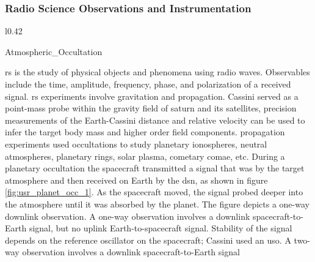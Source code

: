 \documentclass[crop=false,class=article,oneside]{standalone}
\begin{document}
        \subsubsection{Radio Science Observations
                       and Instrumentation}
            \label{subsubsec:usr_rad_sci_obs_and_inst}
            \begin{wrapfigure}[11]{l}{0.42\textwidth}
                \centering
                \captionsetup{type=figure}
                
                          {Atmospheric_Occultation}
                \caption{Refraction via an 
                         Atmospheric Occultation}
                \label{fig:usr_planet_occ_1}
            \end{wrapfigure}
            \gls{rs} is the study of physical objects and
            phenomena using \gls{radio waves}.
            Observables include the time, \gls{amplitude},
            \gls{frequency}, \gls{phase}, and
            \gls{polarization} of a received signal.
            \gls{rs} experiments involve \gls{gravitation}
            and \gls{propagation}. Cassini served as a
            point-mass probe within the gravity field
            of \gls{saturn} and its satellites, precision
            measurements of the Earth-Cassini distance
            and \gls{relative velocity} can be used to
            infer the target body mass and higher order
            field components. \Gls{propagation} experiments
            used \glspl{occultation} to study planetary
            \glspl{ionosphere}, \glspl{neutral atmosphere},
            \gls{planetary rings}, \gls{solar plasma},
            \gls{cometary comae}, etc. During a planetary
            \gls{occultation} the spacecraft transmitted
            a signal that was
             by the
            target atmosphere and then received on Earth
            by the \gls{dsn}, as shown in figure
            \ref{fig:usr_planet_occ_1}. As the spacecraft
            moved, the signal probed deeper into the
            atmosphere until it was absorbed by the planet.
            The figure depicts a one-way \gls{downlink}
            observation. A \gls{one-way observation}
            involves a \gls{downlink} spacecraft-to-Earth
            signal, but no \gls{uplink} Earth-to-spacecraft
            signal. Stability of the signal depends on the
            reference \gls{oscillator} on the spacecraft;
            Cassini used an \gls{uso}.
            A \gls{two-way observation} involves a
            \gls{downlink} spacecraft-to-Earth signal
\end{document}
